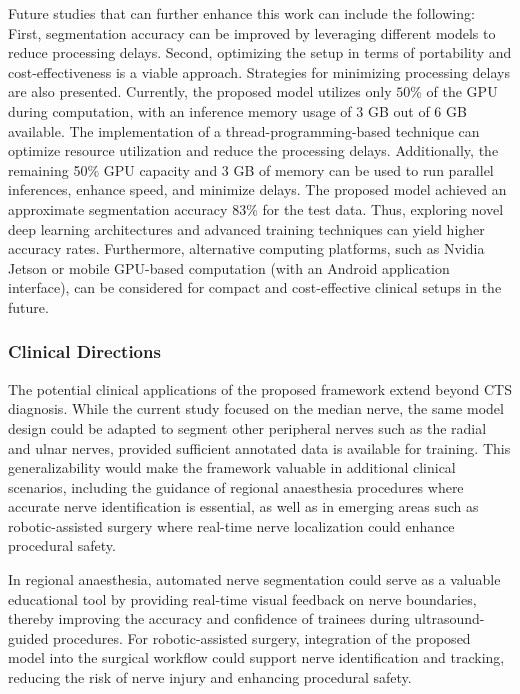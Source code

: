 Future studies that can further enhance this work can include the following: First, segmentation accuracy can be improved by leveraging different models to reduce processing delays. Second, optimizing the setup in terms of portability and cost-effectiveness is a viable approach. Strategies for minimizing processing delays are also presented. Currently, the proposed model utilizes only $50$\% of the GPU during computation, with an inference memory usage of $3$ GB out of $6$ GB available. The implementation of a thread-programming-based technique can optimize resource utilization and reduce the processing delays. Additionally, the remaining 50\% GPU capacity and $3$ GB of memory can be used to run parallel inferences, enhance speed, and minimize delays. The proposed model achieved an approximate segmentation accuracy $83$\% for the test data. Thus, exploring novel deep learning architectures and advanced training techniques can yield higher accuracy rates. Furthermore, alternative computing platforms, such as Nvidia Jetson or mobile GPU-based computation (with an Android application interface), can be considered for compact and cost-effective clinical setups in the future.


\subsubsection{Clinical Directions}
\noindent
The potential clinical applications of the proposed framework extend beyond CTS diagnosis. While the current study focused on the median nerve, the same model design could be adapted to segment other peripheral nerves such as the radial and ulnar nerves, provided sufficient annotated data is available for training. This generalizability would make the framework valuable in additional clinical scenarios, including the guidance of regional anaesthesia procedures where accurate nerve identification is essential, as well as in emerging areas such as robotic-assisted surgery where real-time nerve localization could enhance procedural safety.

\noindent
In regional anaesthesia, automated nerve segmentation could serve as a valuable educational tool by providing real-time visual feedback on nerve boundaries, thereby improving the accuracy and confidence of trainees during ultrasound-guided procedures. For robotic-assisted surgery, integration of the proposed model into the surgical workflow could support nerve identification and tracking, reducing the risk of nerve injury and enhancing procedural safety.








